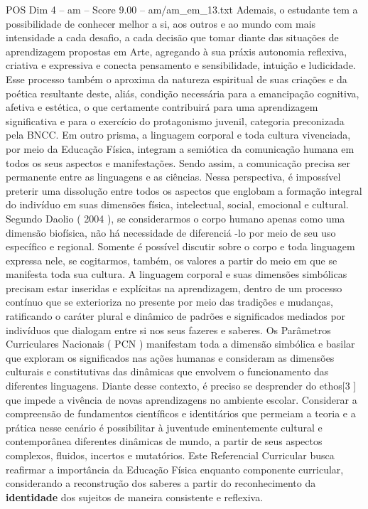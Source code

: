 \begin{textsample}{POS Dim 4 – am – Score 9.00 – am/am\_em\_13.txt}
Ademais, o estudante tem a possibilidade de conhecer melhor a si, aos outros e ao mundo com mais intensidade a cada desafio, a cada decisão que tomar diante das situações de aprendizagem propostas em Arte, agregando à sua práxis autonomia reflexiva, criativa e expressiva e conecta pensamento e sensibilidade, intuição e ludicidade.
Esse processo também o aproxima da natureza espiritual de suas criações e da poética resultante deste, aliás, condição necessária para a emancipação cognitiva, afetiva e estética, o que certamente contribuirá para uma aprendizagem significativa e para o exercício do protagonismo juvenil, categoria preconizada pela BNCC.
Em outro prisma, a linguagem corporal e toda cultura vivenciada, por meio da Educação Física, integram a semiótica da comunicação humana em todos os seus aspectos e manifestações.
Sendo assim, a comunicação precisa ser permanente entre as linguagens e as ciências.
Nessa perspectiva, é impossível preterir uma dissolução entre todos os aspectos que englobam a formação integral do indivíduo em suas dimensões física, intelectual, social, emocional e cultural.
Segundo Daolio ( 2004 ), se considerarmos o corpo humano apenas como uma dimensão biofísica, não há necessidade de diferenciá -lo por meio de seu uso específico e regional.
Somente é possível discutir sobre o corpo e toda linguagem expressa nele, se cogitarmos, também, os valores a partir do meio em que se manifesta toda sua cultura.
A linguagem corporal e suas dimensões simbólicas precisam estar inseridas e explícitas na aprendizagem, dentro de um processo contínuo que se exterioriza no presente por meio das tradições e mudanças, ratificando o caráter plural e dinâmico de padrões e significados mediados por indivíduos que dialogam entre si nos seus fazeres e saberes.
Os Parâmetros Curriculares Nacionais ( PCN ) manifestam toda a dimensão simbólica e basilar que exploram os significados nas ações humanas e consideram as dimensões culturais e constitutivas das dinâmicas que envolvem o funcionamento das diferentes linguagens.
Diante desse contexto, é preciso se desprender do ethos[3 ] que impede a vivência de novas aprendizagens no ambiente escolar.
Considerar a compreensão de fundamentos científicos e identitários que permeiam a teoria e a prática nesse cenário é possibilitar à juventude eminentemente cultural e contemporânea diferentes dinâmicas de mundo, a partir de seus aspectos complexos, fluidos, incertos e mutatórios.
Este Referencial Curricular busca reafirmar a importância da Educação Física enquanto componente curricular, considerando a reconstrução dos saberes a partir do reconhecimento da \textbf{identidade} dos sujeitos de maneira consistente e reflexiva.

\end{textsample}
